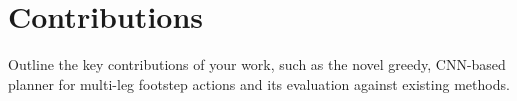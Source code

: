 \section{Contributions}

\begin{outline}
  Outline the key contributions of your work, such as the novel
  greedy, CNN-based planner for multi-leg footstep actions and its
  evaluation against existing methods.
\end{outline}
